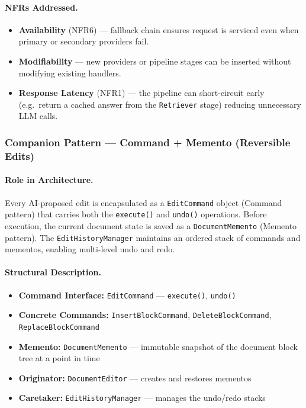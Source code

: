 \documentclass[12pt,a4paper]{article}
\begin{document}
\paragraph{NFRs Addressed.}
\begin{itemize}[nosep]
    \item \textbf{Availability} (NFR6) --- fallback chain ensures request is serviced even when
    primary or secondary providers fail.
    \item \textbf{Modifiability} --- new providers or pipeline stages can be inserted without
    modifying existing handlers.
    \item \textbf{Response Latency} (NFR1) --- the pipeline can short-circuit early (e.g.\ return
    a cached answer from the \texttt{Retriever} stage) reducing unnecessary LLM calls.
\end{itemize}

\subsubsection{Companion Pattern --- Command + Memento (Reversible Edits)}

\paragraph{Role in Architecture.}
Every AI-proposed edit is encapsulated as a \texttt{EditCommand} object (Command pattern) that
carries both the \texttt{execute()} and \texttt{undo()} operations. Before execution, the current
document state is saved as a \texttt{DocumentMemento} (Memento pattern). The
\texttt{EditHistoryManager} maintains an ordered stack of commands and mementos, enabling
multi-level undo and redo.

\paragraph{Structural Description.}
\begin{itemize}[nosep]
    \item \textbf{Command Interface:} \texttt{EditCommand} --- \texttt{execute()}, \texttt{undo()}
    \item \textbf{Concrete Commands:} \texttt{InsertBlockCommand}, \texttt{DeleteBlockCommand},
    \texttt{ReplaceBlockCommand}
    \item \textbf{Memento:} \texttt{DocumentMemento} --- immutable snapshot of the document block
    tree at a point in time
    \item \textbf{Originator:} \texttt{DocumentEditor} --- creates and restores mementos
    \item \textbf{Caretaker:} \texttt{EditHistoryManager} --- manages the undo/redo stacks
\end{itemize}
\end{document}
